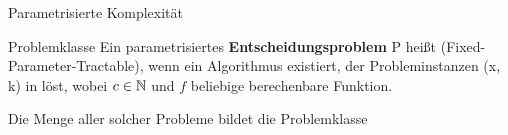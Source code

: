 \documentclass[navbaroff]{sdqbeamer}
\begin{document}
\begin{frame}{Parametrisierte Komplexität}
    \begin{blueblock}{Problemklasse \FPT}
        Ein parametrisiertes \textbf{Entscheidungsproblem} P heißt \FPT  (Fixed-Parameter-Tractable),
        wenn ein Algorithmus existiert, der Probleminstanzen (x, k) in \BigO{\textcolor{blue}{f(k)} \cdot \textcolor{red}{|x|^c}} löst, wobei $ c \in \mathbb{N} $ und $f$ beliebige berechenbare Funktion.
        
        \vspace{10pt}
        Die Menge aller solcher Probleme bildet die Problemklasse \FPT
    \end{blueblock}  
    


\end{frame}
\end{document}
